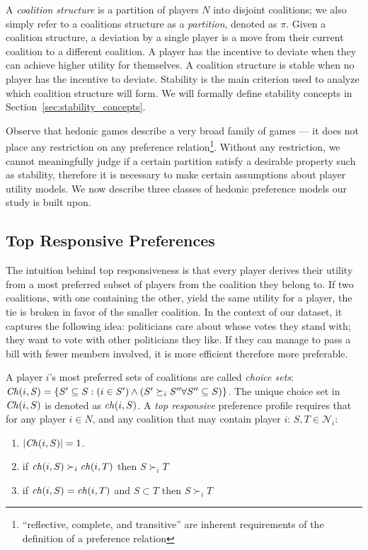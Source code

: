 A \textit{coalition structure} is a partition of players $N$ into disjoint
coalitions;
we also simply refer to a coalitions structure as a \textit{partition},
denoted as $\pi$.
Given a coalition structure, a deviation by a single player is a
move from their current coalition to a different coalition.
A player has the incentive to deviate when they can achieve higher utility for
themselves.
A coalition structure is stable when no player has the incentive to deviate.
Stability is the main criterion used to analyze which coalition structure will 
form.
We will formally define stability concepts in Section~\ref{sec:stability_concepts}.

Observe that hedonic games describe a very broad family of games --- it does not
place any restriction on any preference relation\footnote{``reflective, complete, 
and transitive'' are inherent requirements of the definition of a preference
relation}.
Without any restriction, we cannot meaningfully judge if a certain partition
satisfy a desirable property such as stability, therefore it is necessary to make
certain assumptions about player utility models.
We now describe three classes of hedonic preference models our study is built upon.

\subsection{Top Responsive Preferences}
\label{subsec:top_responsive_preferences}
The intuition behind top responsiveness is that every player derives their
utility from a most preferred subset of players from the coalition they belong to.
If two coalitions, with one containing the other, yield the same utility for
a player, the tie is broken in favor of the smaller coalition.
In the context of our dataset, it captures the following idea:
politicians care about whose votes they stand with;
they want to vote with other politicians they like.
If they can manage to pass a bill with fewer members involved,
it is more efficient therefore more preferable.

A player $i$'s most preferred sets of coalitions are called \textit{choice sets}:
$\mathit{Ch}(i, S) = \{S' \subseteq S: (i \in S') \wedge (S' \succeq_i S'' \forall S'' \subseteq S)\}$.
The unique choice set in $\mathit{Ch}(i, S)$ is denoted as $\mathit{ch}(i, S)$.
A {\em top responsive} preference profile requires that for any player $i \in N$,
and any coalition that may contain player $i$: $S, T \in \mathcal{N}_i$:
\begin{enumerate}
  \item $|\mathit{Ch}(i, S)| = 1$.
  \item if $\mathit{ch}(i, S) \succ_i \mathit{ch}(i, T)$ then $S \succ_i T$
  \item if $\mathit{ch}(i, S) = \mathit{ch}(i, T)$ and $S \subset T$ then $S \succ_i T$
\end{enumerate}
 
